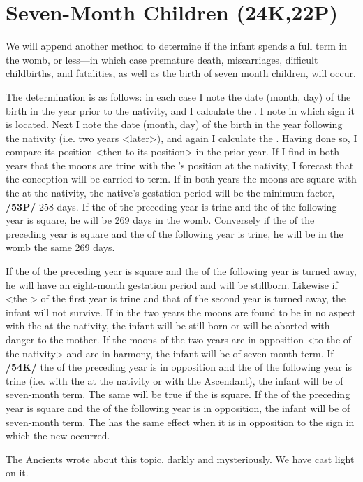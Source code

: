 \section{Seven-Month Children (24K,22P)}

We will append another method to determine if the infant spends a full term in the womb, or less—in which case premature death, miscarriages, difficult childbirths, and fatalities, as well as the birth of seven month children, will occur. 

The determination is as follows: in each case I note the date (month, day) of the birth in the year prior to the nativity, and I calculate the \Moon. I note in which sign it is located.
Next I note the date (month, day) of the birth in the year following the nativity (i.e. two years <later>), and
again I calculate the \Moon. Having done so, I compare its position <then to its position> in the prior year. If I find in both years that the moons are trine with the \Moon’s position at the nativity, I forecast that the conception will be carried to term. If in both years the moons are square with the \Moon\xspace at the nativity, the native’s gestation period will be the minimum factor, \textbf{/53P/} 258 days. If the \Moon\xspace of the preceding year is trine and the \Moon\xspace of the following year is square, he will be 269 days in the womb. Conversely if the \Moon\xspace of the preceding year is square and the \Moon\xspace of the following year is trine, he will be in the womb the same 269 days.

If the \Moon\xspace of the preceding year is square and the \Moon\xspace of the following year is turned away, he will
have an eight-month gestation period and will be stillborn. Likewise if <the \Moon> of the first year is trine and that of the second year is turned away, the infant will not survive. If in the two years the moons are found to be in no aspect with the \Moon\xspace at the nativity, the infant will be still-born or will be aborted with danger to the mother. If the moons of the two years are in opposition <to the \Moon\xspace of the nativity> and are in harmony, the infant will be of seven-month term. If \textbf{/54K/} the \Moon\xspace of the preceding year is in opposition and the \Moon\xspace of the following year is trine (i.e. with the \Moon\xspace at the nativity or with the Ascendant), the infant will be of seven-month term. The same will be true if the \Moon\xspace is square. If the \Moon\xspace of the preceding year is square and the \Moon\xspace of the following year is in opposition, the infant will be of seven-month term. The \Sun\xspace has the same effect when it is in opposition to the sign in which the new \Moon\xspace occurred.

The Ancients wrote about this topic, darkly and mysteriously. We have cast light on it.

\newpage